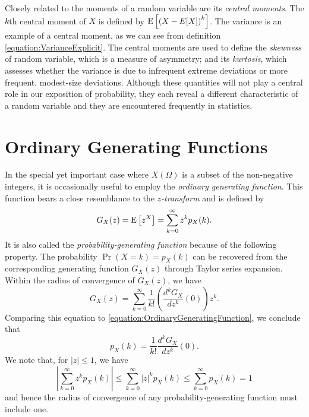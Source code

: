 Closely related to the moments of a random variable are its \emph{central moments}. 
The $k$th central moment of $X$ is defined by $\mathrm{E} \left[ \left( X - E[X] \right)^k \right]$.
The variance is an example of a central moment, as we can see from definition \eqref{equation:VarianceExplicit}.
The central moments are used to define the \emph{skewness} of random variable, which is a measure of asymmetry; and its \emph{kurtosis}, which assesses whether the variance is due to infrequent extreme deviations or more frequent, modest-size deviations.
Although these quantities will not play a central role in our exposition of probability, they each reveal a different characteristic of a random variable and they are encountered frequently in statistics. 


\section{Ordinary Generating Functions}
\label{section:OrdinaryGeneratingFunctions}

In the special yet important case where $X(\Omega)$ is a subset of the non-negative integers, it is occasionally useful to employ the \emph{ordinary generating function}. 
This function bears a close resemblance to the \emph{$z$-transform} and is defined by 
\begin{equation} \label{equation:OrdinaryGeneratingFunction}
G_X(z) = \mathrm{E} \left[ z^X \right] = \sum_{k=0}^{\infty} z^k p_X (k) .
\end{equation}
It is also called the \emph{probability-generating function} because of the following property. 
The probability $\Pr (X = k) = p_X(k)$ can be recovered from the corresponding generating function $G_X (z)$ through Taylor series expansion.
Within the radius of convergence of $G_X(z)$, we have
\begin{equation*}
G_X(z) = \sum_{k=0}^{\infty} \frac{1}{k!} \left( \frac{d^k G_X}{dz^k}(0) \right) z^k .
\end{equation*}
Comparing this equation to \eqref{equation:OrdinaryGeneratingFunction}, we conclude that
\begin{equation*}
p_X(k) = \frac{1}{k!} \frac{d^k G_X}{dz^k} (0) .
\end{equation*}
We note that, for $|z| \leq 1$, we have
\begin{equation*}
\left| \sum_{k=0}^{\infty} z^k p_X(k) \right|
\leq \sum_{k=0}^{\infty} |z|^k p_X(k)
\leq \sum_{k=0}^{\infty} p_X(k) = 1
\end{equation*}
and hence the radius of convergence of any probability-generating function must include one.

